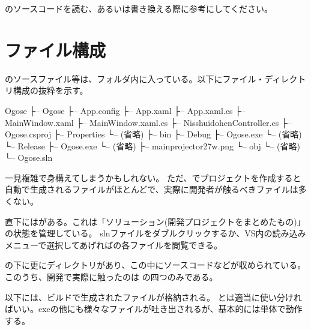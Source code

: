 \documentclass[letterpaper,10pt,dvipdfmx]{sphinxmanual}
\begin{document}
のソースコードを読む、あるいは書き換える際に参考にしてください。


\section{ファイル構成}
\label{\detokenize{nissyu-idohen/pc-software-code:id2}}
のソースファイル等は、フォルダ内に入っている。以下にファイル・ディレクトリ構成の抜粋を示す。

\begin{sphinxVerbatim}[commandchars=\\\{\}]
Ogose
├-- Ogose
\textbar{}   ├-- App.config
\textbar{}   ├-- App.xaml
\textbar{}   ├-- App.xaml.cs
\textbar{}   ├-- MainWindow.xaml
\textbar{}   ├-- MainWindow.xaml.cs
\textbar{}   ├-- NisshuidohenController.cs
\textbar{}   ├-- Ogose.csproj
\textbar{}   ├-- Properties
\textbar{}   \textbar{}   └-- (省略)
\textbar{}   ├-- bin
\textbar{}   \textbar{}   ├-- Debug
\textbar{}   \textbar{}   \textbar{}   ├-- Ogose.exe
\textbar{}   \textbar{}   \textbar{}   └-- (省略)
\textbar{}   \textbar{}   └-- Release
\textbar{}   \textbar{}       ├-- Ogose.exe
\textbar{}   \textbar{}       └-- (省略)
\textbar{}   ├-- main\PYGZus{}projector\PYGZus{}27\PYGZus{}w.png
\textbar{}   └-- obj
\textbar{}       └-- (省略)
└-- Ogose.sln
\end{sphinxVerbatim}

一見複雑で身構えてしまうかもしれない。
ただ、でプロジェクトを作成すると自動で生成されるファイルがほとんどで、実際に開発者が触るべきファイルは多くない。

直下にはがある。これは「ソリューション(開発プロジェクトをまとめたもの)」の状態を管理している。
slnファイルをダブルクリックするか、VS内の読み込みメニューで選択してあげればの各ファイルを閲覧できる。

の下に更にディレクトリがあり、この中にソースコードなどが収められている。
このうち、開発で実際に触ったのは 
 の四つのみである。

以下には、ビルドで生成されたファイルが格納される。
とは適当に使い分ければいい。exeの他にも様々なファイルが吐き出されるが、基本的には単体で動作する。
\end{document}
